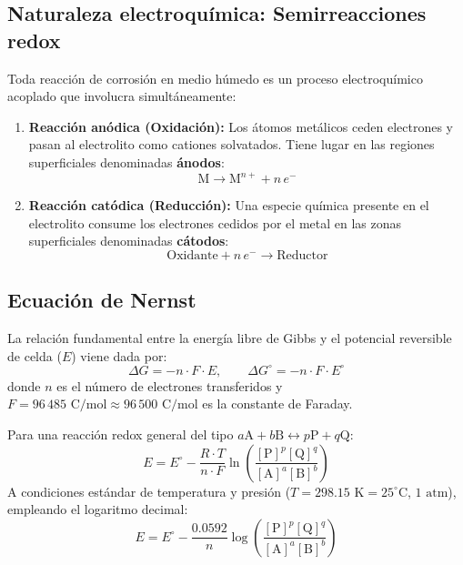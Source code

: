 \subsection{Naturaleza electroquímica: Semirreacciones redox}
Toda reacción de corrosión en medio húmedo es un proceso electroquímico acoplado que involucra simultáneamente:
\begin{enumerate}
    \item \textbf{Reacción anódica (Oxidación):} Los átomos metálicos ceden electrones y pasan al electrolito como cationes solvatados. Tiene lugar en las regiones superficiales denominadas \textbf{ánodos}:
          \begin{equation}
              \text{M} \longrightarrow \text{M}^{n+} + n\,e^-
          \end{equation}
    \item \textbf{Reacción catódica (Reducción):} Una especie química presente en el electrolito consume los electrones cedidos por el metal en las zonas superficiales denominadas \textbf{cátodos}:
          \begin{equation}
              \text{Oxidante} + n\,e^- \longrightarrow \text{Reductor}
          \end{equation}
\end{enumerate}


\subsection{Ecuación de Nernst}
La relación fundamental entre la energía libre de Gibbs y el potencial reversible de celda ($E$) viene dada por:
\begin{equation}
    \Delta G = -n \cdot F \cdot E, \qquad \Delta G^\circ = -n \cdot F \cdot E^\circ
\end{equation}
donde $n$ es el número de electrones transferidos y $F = 96\,485\text{ C/mol} \approx 96\,500\text{ C/mol}$ es la constante de Faraday.

Para una reacción redox general del tipo $a\text{A} + b\text{B} \longleftrightarrow p\text{P} + q\text{Q}$:
\begin{equation}
    E = E^\circ - \frac{R \cdot T}{n \cdot F} \ln \left( \frac{[\text{P}]^p [\text{Q}]^q}{[\text{A}]^a [\text{B}]^b} \right)
    \label{eq:nernst_general}
\end{equation}
A condiciones estándar de temperatura y presión ($T = 298.15\text{ K} = 25^\circ\text{C}$, $1\text{ atm}$), empleando el logaritmo decimal:
\begin{equation}
    E = E^\circ - \frac{0.0592}{n} \log \left( \frac{[\text{P}]^p [\text{Q}]^q}{[\text{A}]^a [\text{B}]^b} \right)
    \label{eq:nernst_25C}
\end{equation}

